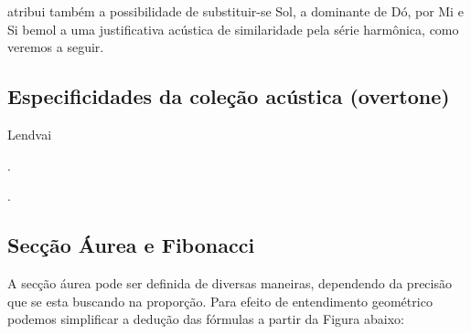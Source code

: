 \documentclass[
	12pt,				%
	openright,			%
	twoside,			%
	a4paper,			%
	english,			%
	french,				%
	spanish,			%
	brazil				%
	]{abntex2}
\begin{document}
 atribui também a possibilidade de substituir-se Sol, a dominante de Dó, por Mi e Si bemol a uma justificativa acústica de similaridade pela série harmônica, como veremos a seguir. 




\subsection{Especificidades da coleção acústica (overtone)}

Lendvai









.




.




\pagebreak
\subsection{Secção Áurea e Fibonacci}

A secção áurea pode ser definida de diversas maneiras, dependendo da precisão que se esta buscando na proporção. Para efeito de entendimento geométrico podemos simplificar a dedução das fórmulas a partir da Figura abaixo: 
\end{document}
